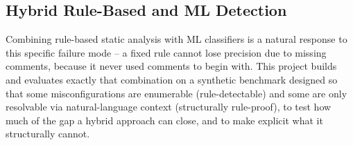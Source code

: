 \subsection{Hybrid Rule-Based and ML Detection}
Combining rule-based static analysis with ML classifiers is a natural response to this specific failure mode -- a fixed rule cannot lose precision due to missing comments, because it never used comments to begin with. This project builds and evaluates exactly that combination on a synthetic benchmark designed so that some misconfigurations are enumerable (rule-detectable) and some are only resolvable via natural-language context (structurally rule-proof), to test how much of the gap a hybrid approach can close, and to make explicit what it structurally cannot.
